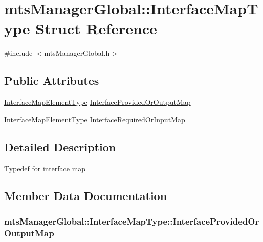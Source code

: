 \hypertarget{structmts_manager_global_1_1_interface_map_type}{}\section{mts\+Manager\+Global\+:\+:Interface\+Map\+Type Struct Reference}
\label{structmts_manager_global_1_1_interface_map_type}


{\ttfamily \#include $<$mts\+Manager\+Global.\+h$>$}

\subsection*{Public Attributes}
\begin{DoxyCompactItemize}
\item 
\hyperlink{classmts_manager_global_a3449158e2432ced5a21d4853a2ca59b6}{Interface\+Map\+Element\+Type} \hyperlink{structmts_manager_global_1_1_interface_map_type_ac18ba96691e610718e7723deaf599f5a}{Interface\+Provided\+Or\+Output\+Map}
\item 
\hyperlink{classmts_manager_global_a3449158e2432ced5a21d4853a2ca59b6}{Interface\+Map\+Element\+Type} \hyperlink{structmts_manager_global_1_1_interface_map_type_a455b80cd0b508438ad1ddba4eabf341c}{Interface\+Required\+Or\+Input\+Map}
\end{DoxyCompactItemize}


\subsection{Detailed Description}
Typedef for interface map 

\subsection{Member Data Documentation}
\hypertarget{structmts_manager_global_1_1_interface_map_type_ac18ba96691e610718e7723deaf599f5a}{}
\subsubsection[{Interface\+Provided\+Or\+Output\+Map}]{ mts\+Manager\+Global\+::\+Interface\+Map\+Type\+::\+Interface\+Provided\+Or\+Output\+Map}\label{structmts_manager_global_1_1_interface_map_type_ac18ba96691e610718e7723deaf599f5a}
\hypertarget{structmts_manager_global_1_1_interface_map_type_a455b80cd0b508438ad1ddba4eabf341c}{}
